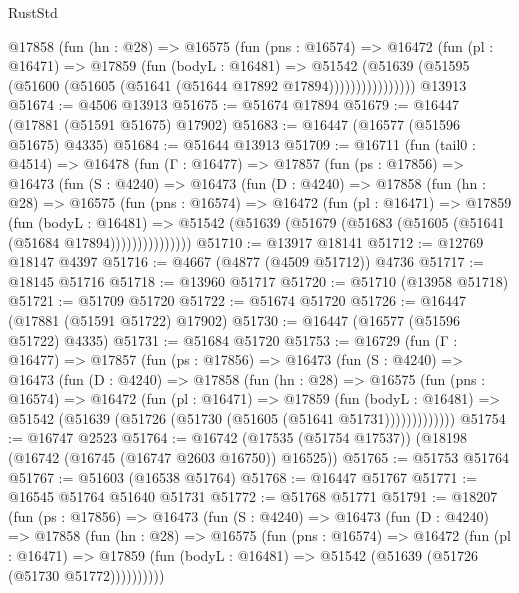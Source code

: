 \begin{lexlean}{RustStd}
\begin{coremodule}
              @17858
                (fun (hn : @28) =>
                @16575
                  (fun (pns : @16574) =>
                  @16472
                    (fun (pl : @16471) =>
                    @17859
                      (fun (bodyL : @16481) =>
                      @51542
                        (@51639
                          (@51595 (@51600 (@51605 (@51641 (@51644 @17892 @17894))))))))))))))))
    @13913
@51674 := @4506 @13913
@51675 := @51674 @17894
@51679 := @16447 (@17881 (@51591 @51675) @17902)
@51683 := @16447 (@16577 (@51596 @51675) @4335)
@51684 := @51644 @13913
@51709 := @16711
    (fun (tail0 : @4514) =>
    @16478
      (fun (Γ : @16477) =>
      @17857
        (fun (ps : @17856) =>
        @16473
          (fun (S : @4240) =>
          @16473
            (fun (D : @4240) =>
            @17858
              (fun (hn : @28) =>
              @16575
                (fun (pns : @16574) =>
                @16472
                  (fun (pl : @16471) =>
                  @17859
                    (fun (bodyL : @16481) =>
                    @51542 (@51639 (@51679 (@51683 (@51605 (@51641 (@51684 @17894)))))))))))))))
@51710 := @13917 @18141
@51712 := @12769 @18147 @4397
@51716 := @4667 (@4877 (@4509 @51712)) @4736
@51717 := @18145 @51716
@51718 := @13960 @51717
@51720 := @51710 (@13958 @51718)
@51721 := @51709 @51720
@51722 := @51674 @51720
@51726 := @16447 (@17881 (@51591 @51722) @17902)
@51730 := @16447 (@16577 (@51596 @51722) @4335)
@51731 := @51684 @51720
@51753 := @16729
    (fun (Γ : @16477) =>
    @17857
      (fun (ps : @17856) =>
      @16473
        (fun (S : @4240) =>
        @16473
          (fun (D : @4240) =>
          @17858
            (fun (hn : @28) =>
            @16575
              (fun (pns : @16574) =>
              @16472
                (fun (pl : @16471) =>
                @17859
                  (fun (bodyL : @16481) =>
                  @51542 (@51639 (@51726 (@51730 (@51605 (@51641 @51731)))))))))))))
@51754 := @16747 @2523
@51764 := @16742 (@17535 (@51754 @17537)) (@18198 (@16742 (@16745 (@16747 @2603 @16750)) @16525))
@51765 := @51753 @51764
@51767 := @51603 (@16538 @51764)
@51768 := @16447 @51767
@51771 := @16545 @51764 @51640 @51731
@51772 := @51768 @51771
@51791 := @18207
    (fun (ps : @17856) =>
    @16473
      (fun (S : @4240) =>
      @16473
        (fun (D : @4240) =>
        @17858
          (fun (hn : @28) =>
          @16575
            (fun (pns : @16574) =>
            @16472
              (fun (pl : @16471) =>
              @17859 (fun (bodyL : @16481) => @51542 (@51639 (@51726 (@51730 @51772))))))))))

\end{coremodule}
\end{lexlean}
